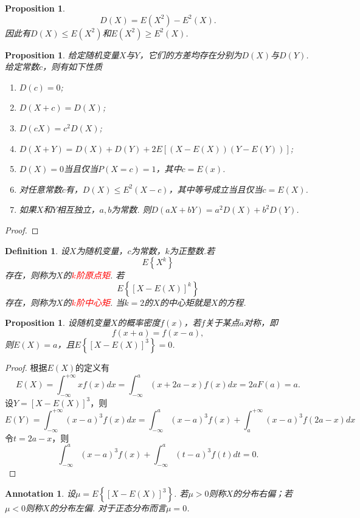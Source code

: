 \documentclass{article}
\newtheorem{proposition}[theorem]{Proposition}
\newtheorem{definition}[theorem]{Definition}
\newtheorem{annotation}[theorem]{Annotation}
\newcommand{\redt}[1]{\textcolor{red}{#1}}
\begin{document}
\begin{proposition}
\rm 
$$
D(X)= E(X^2) - E^2(X). 
$$
因此有$D(X) \leq E(X^2)$和$E(X^2) \geq E^2(X)$.
\end{proposition}


\begin{proposition}
\rm 给定随机变量$X$与$Y$，它们的方差均存在分别为$D(X)$与$D(Y)$. 给定常数$c$，则有如下性质
\begin{enumerate}
	\item $D(c) = 0$;
	\item $D(X+c) = D(X)$;
	\item $D(cX) = c^2D(X)$;
	\item $D(X+Y) = D(X)+D(Y)+2E\left[(X-E(X))(Y-E(Y))\right]$;
	\item $D(X) = 0$当且仅当$P(X=c) = 1$，其中$c=E(x)$.
	\item 对任意常数$c$有，$D(X) \leq E^2(X-c)$，其中等号成立当且仅当$c = E(X)$.
	\item 如果$X$和$Y$相互独立，$a,b$为常数. 则$D(aX+bY)=a^2D(X)+b^2D(Y)$.
\end{enumerate}
\end{proposition}

\begin{proof}
\rm 
\end{proof}


\begin{definition}
\rm 设$X$为随机变量，$c$为常数，$k$为正整数.若
$$
E \left\{ X^k \right\}
$$
存在，则称为$X$的\redt{$k$阶原点矩}. 若
$$
E \left\{ \left[X-E(X)\right]^k \right\}
$$
存在，则称为$X$的\redt{$k$阶中心矩}. 当$k=2$的$X$的中心矩就是$X$的方程. 
\end{definition}

\begin{proposition}
\rm 设随机变量$X$的概率密度$f(x)$，若$f$关于某点$a$对称，即
$$
f(x+a) = f(x-a),
$$
则$E(X) = a$，且$E \left\{ \left[X-E(X)\right]^3 \right\} = 0$.
\end{proposition}


\begin{proof}
根据$E(X)$的定义有
$$
E(X) = \int_{-\infty}^{+\infty}xf(x)dx = \int_{-\infty}^{a} (x + 2a-x)f(x)dx = 2aF(a) = a.
$$
设$Y = \left[X-E(X)\right]^3$，则
$$
E(Y) = \int_{-\infty}^{+\infty}(x-a)^3f(x)dx = \int_{-\infty}^a (x-a)^3f(x) + \int_{a}^{+\infty} (x-a)^3f(2a-x)dx
$$
令$t=2a-x$，则
$$
\int_{-\infty}^a (x-a)^3f(x) + \int_{-\infty}^{a} (t-a)^3f(t)dt = 0.
$$
\end{proof}

\begin{annotation}
\rm 设$\mu = E \left\{ \left[X-E(X)\right]^3 \right\}$. 若$\mu > 0$则称$X$的分布右偏；若$\mu < 0$则称$X$的分布左偏. 对于正态分布而言$\mu = 0$. 
\end{annotation}
\end{document}
